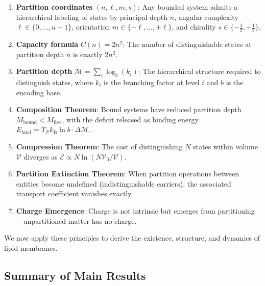 \documentclass[twocolumn,10pt]{article}
\theoremstyle{remark}
\newcommand{\kB}{k_{\mathrm{B}}}
\newcommand{\Depth}{\mathcal{M}}
\newcommand{\Partition}{\mathcal{P}}
\newcommand{\Cost}{\mathcal{E}}
\newcommand{\Mfree}{M_{\mathrm{free}}}
\newcommand{\Mbound}{M_{\mathrm{bound}}}
\begin{document}
\begin{enumerate}[label=(\roman*)]
    \item \textbf{Partition coordinates} $(n, \ell, m, s)$: Any bounded system admits a hierarchical labeling of states by principal depth $n$, angular complexity $\ell \in \{0, \ldots, n-1\}$, orientation $m \in \{-\ell, \ldots, +\ell\}$, and chirality $s \in \{-\frac{1}{2}, +\frac{1}{2}\}$.

    \item \textbf{Capacity formula} $C(n) = 2n^2$: The number of distinguishable states at partition depth $n$ is exactly $2n^2$.

    \item \textbf{Partition depth} $\Depth = \sum_i \log_b(k_i)$: The hierarchical structure required to distinguish states, where $k_i$ is the branching factor at level $i$ and $b$ is the encoding base.

    \item \textbf{Composition Theorem}: Bound systems have reduced partition depth $\Mbound < \Mfree$, with the deficit released as binding energy $E_{\text{bind}} = T_\Partition \kB \ln b \cdot \Delta\Depth$.

    \item \textbf{Compression Theorem}: The cost of distinguishing $N$ states within volume $\mathcal{V}$ diverges as $\Cost \propto N \ln(N\mathcal{V}_0/\mathcal{V})$.

    \item \textbf{Partition Extinction Theorem}: When partition operations between entities become undefined (indistinguishable carriers), the associated transport coefficient vanishes exactly.

    \item \textbf{Charge Emergence}: Charge is not intrinsic but emerges from partitioning---unpartitioned matter has no charge.
\end{enumerate}

We now apply these principles to derive the existence, structure, and dynamics of lipid membranes.

\subsection{Summary of Main Results}
\end{document}
